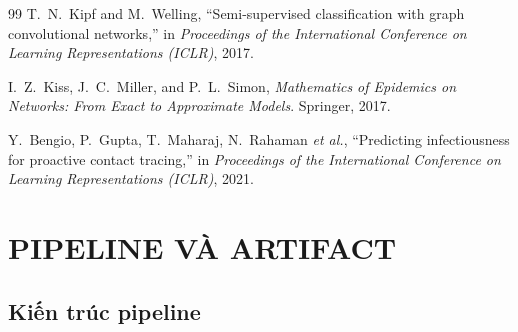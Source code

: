 \documentclass[12pt,a4paper]{report}
\theoremstyle{definition}
\begin{document}
\begin{thebibliography}{99}
    T.~N.~Kipf and M.~Welling,
    ``Semi-supervised classification with graph convolutional networks,''
    in \textit{Proceedings of the International Conference on Learning Representations (ICLR)}, 2017.

    I.~Z.~Kiss, J.~C.~Miller, and P.~L.~Simon,
    \textit{Mathematics of Epidemics on Networks: From Exact to Approximate Models}.
    Springer, 2017.

    Y.~Bengio, P.~Gupta, T.~Maharaj, N.~Rahaman \textit{et al.},
    ``Predicting infectiousness for proactive contact tracing,''
    in \textit{Proceedings of the International Conference on Learning Representations (ICLR)}, 2021.

\end{thebibliography}

\appendix

\chapter{PIPELINE VÀ ARTIFACT}
\label{appendix:pipeline}

\section{Kiến trúc pipeline}
\end{document}
